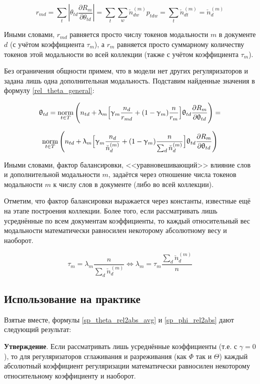 \[
r_{md} = \sum_t |\theta_{td} \frac{\partial R_m}{\partial \theta_{td}}| = \sum_t \sum_w \check{n}_{dw}^{(m)} p_{tdw} = \sum_t  \check{n}_{dt}^{(m)} = \check{n}_{d}^{(m)}
\]

Иными словами, $r_{md}$ равняется просто числу токенов модальности $m$ в документе $d$ (с учётом коэффициента $\tau_m$), а $r_m$ равняется просто суммарному количеству токенов этой модальности во всей коллекции (также с учётом коэффициента $\tau_m$).

Без ограничения общности примем, что в модели нет других регуляризаторов и задана лишь одна дополнительная модальность. Подставим найденные значения в формулу \ref{rel_theta_general}:

\[
\uptheta_{td} = \mathop{\mathrm{norm}}\limits_{t \in T} \Bigg(
    n_{td} + \uplambda_m \Big[
        \upgamma_m \frac{n_d}{r_{md}} + (1-\upgamma_m)\frac{n}{r_m}
        \Big]
    \uptheta_{td} \frac{\partial R_m}{\partial \uptheta_{td}}
\Bigg) =
\]

\[
\mathop{\mathrm{norm}}\limits_{t \in T} \Bigg(
    n_{td} + \uplambda_m \Big[
        \upgamma_m \frac{n_d}{\check{n}_d^{(m)}} + (1-\upgamma_m)\frac{n}{\sum_d \check{n}_d^{(m)}}
        \Big]
    \uptheta_{td} \frac{\partial R_m}{\partial \uptheta_{td}}
\Bigg)
\]

Иными словами, фактор балансировки, <<уравновешивающий>> влияние слов и дополнительной модальности $m$, задаётся через отношение числа токенов модальности $m$ к числу слов в документе (либо во всей коллекции).

Отметим, что фактор балансировки выражается через константы, известные ещё на этапе построения коллекции.  Более того, если рассматривать лишь усреднённые по всем документам коэффициенты, то каждый относительный вес модальности математически равносилен некоторому абсолютному весу и наоборот.

\[
\tau_m = \lambda_m \frac{n}{\sum_d \check{n}_d^{(m)}} \iff
\lambda_m = \tau_m \frac{\sum_d \check{n}_d^{(m)}}{n}
\]

\subsection{Использование на практике}

Взятые вместе, формулы \ref{sp_theta_rel2abs_avg} и \ref{sp_phi_rel2abs} дают следующий результат:

\textbf{Утверждение}. Если рассматривать лишь усреднённые коэффициенты (т.е. с $\gamma=0$), то для регуляризаторов сглаживания и разреживания (как $\Phi$ так и $\Theta$) каждый абсолютный коэффициент регуляризации математически равносилен некоторому относительному коэффициенту и наоборот.

